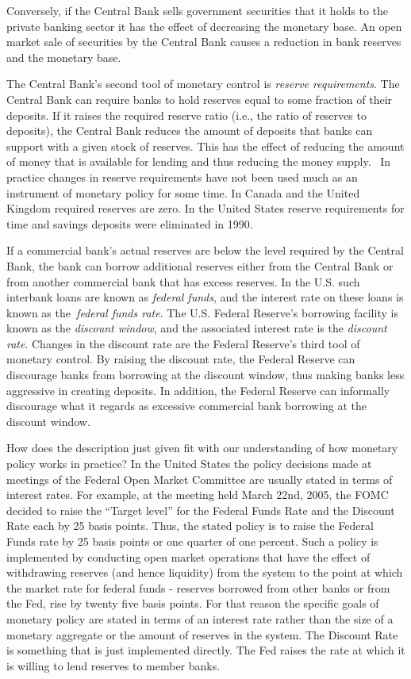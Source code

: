 \documentclass[letterpaper,12pt]{article}
\begin{document}
Conversely, if the Central Bank sells government securities that it
holds to the private banking sector it has the effect of decreasing
the monetary base. An open market sale of securities by the Central
Bank causes a reduction in bank reserves and the monetary base.

The Central Bank's second tool of monetary control is
\textit{reserve requirements}. The Central Bank can require banks to
hold reserves equal to some fraction of their deposits. If it raises
the required reserve ratio (i.e., the ratio of reserves to
deposits), the Central Bank reduces the amount of deposits that
banks can support with a given stock of reserves. This has the
effect of reducing the amount of money that is available for lending
and thus reducing the money supply. \ In practice changes in reserve
requirements have not been used much as an instrument of monetary
policy for some time. In Canada and the United Kingdom required
reserves are zero. In the United States reserve requirements for
time and savings deposits were eliminated in 1990.

If a commercial bank's actual reserves are below the level required
by the Central Bank, the bank can borrow additional reserves either
from the Central Bank or from another commercial bank that has
excess reserves. In the U.S. such interbank loans are known as
\textit{federal funds}, and the interest rate on these loans is
known as the\textit{\ federal funds rate}. The U.S. Federal
Reserve's borrowing facility is known as the \textit{discount
window}, and the associated interest rate is the \textit{discount
rate}. Changes in the discount rate are the Federal Reserve's third
tool of monetary control. By raising the discount rate, the Federal
Reserve can discourage banks from borrowing at the discount window,
thus making banks less aggressive in creating deposits. In addition,
the Federal Reserve can informally discourage what it regards as
excessive commercial bank borrowing at the discount window.

How does the description just given fit with our understanding of
how monetary policy works in practice? In the United States the
policy decisions made at meetings of the Federal Open Market
Committee are usually stated in terms of interest rates. For
example, at the meeting held March 22nd, 2005, the FOMC decided to
raise the ``Target level'' for the Federal Funds Rate and the
Discount Rate each by 25 basis points. Thus, the stated policy is to
raise the Federal Funds rate by 25 basis points or one quarter of
one percent. Such a policy is implemented by conducting open market
operations that have the effect of withdrawing reserves (and hence
liquidity) from the system to the point at which the market rate for
federal funds - reserves borrowed from other banks or from the Fed,
rise by twenty five basis points. For that reason the specific goals
of monetary policy are stated in terms of an interest rate rather
than the size of a monetary aggregate or the amount of reserves in
the system. The Discount Rate is something that is just implemented
directly. The Fed raises the rate at which it is willing to lend
reserves to member banks.
\end{document}
